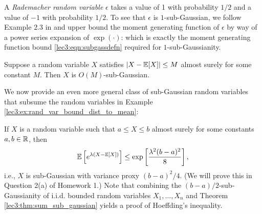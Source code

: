 \begin{example}
    A \textit{Rademacher random variable} $\epsilon$ takes a value of 1 with probability $1/2$ and a value of $-1$ with probability $1/2$. To see that $\epsilon$ is $1$-sub-Gaussian, we follow Example 2.3 in \cite{wainwright2019high} and upper bound the moment generating function of $\epsilon$ by way of a power series expansion of $\exp(\cdot)$:
    which is exactly the moment generating function bound \eqref{lec3:eqn:subgassdefn} required for $1$-sub-Gaussianity.
\end{example}

\begin{example}\label{lec3:ex:rand_var_bound_dist_to_mean}
    Suppose a random variable $X$ satisfies $|X - \operatorname*{\mathbb{E}}[X]| \leq M$ almost surely for some constant $M$. Then $X$ is $O(M)$-sub-Gaussian.
\end{example}
We now provide an even more general class of sub-Gaussian random variables that subsume the random variables in Example \ref{lec3:ex:rand_var_bound_dist_to_mean}:
\begin{example}
    If $X$ is a random variable such that $a \leq X \leq b$ almost surely for some constants $a, b \in \mathbb R$, then
    \begin{equation*}
        \operatorname*{\mathbb{E}}\left[e^{\lambda(X - \operatorname*{\mathbb{E}}[X])}\right] \leq \exp \left[ \frac{\lambda^2(b - a)^2}{8} \right],
    \end{equation*}
    i.e., $X$ is sub-Gaussian with variance proxy $(b - a)^2/4$. (We will prove this in Question 2(a) of Homework 1.) Note that combining the $(b - a)/2$-sub-Gaussianity of i.i.d. bounded random variables $X_1, \dotsc, X_n$ and Theorem \ref{lec3:thm:sum_sub_gaussian} yields a proof of Hoeffding's inequality.
\end{example}

